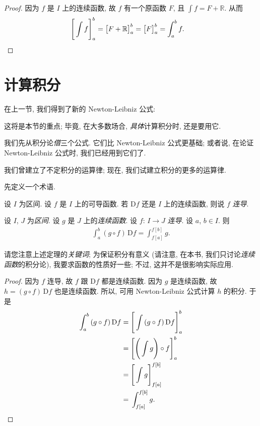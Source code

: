 \begin{proof}
    因为 $f$ 是 $I$ 上的连续函数,
    故 $f$ 有一个原函数 $F$,
    且 $\int {f} = F + \mathbb{R}$.
    从而
    \begin{align*}
         & \Bigg[ \int {f} \Bigg]_{a}^{b}
        = \big[ F + \mathbb{R} \big]_{a}^{b}
        = \big[ F \big]_{a}^{b}
        = \int_{a}^{b} {f}. \qedhere
    \end{align*}
\end{proof}

\section{计算积分}

在上一节, 我们得到了新的 Newton-Leibniz 公式:

\NewNewtonLeibniz*

这将是本节的重点;
毕竟, 在大多数场合, \emph{具体}计算积分时, 还是要用它.

我们先从积分论\emph{借}三个公式.
它们比 Newton-Leibniz 公式更基础;
或者说, 在论证 Newton-Leibniz 公式时, 我们已经用到它们了.

\LinearityOfInegrals*

\AdditivityOfIntervalsOfIntegrals*

我们曾建立了不定积分的运算律;
现在, 我们试建立积分的更多的运算律.

先定义一个术语.

\begin{definition}
    设 $I$ 为区间.
    设 $f$ 是 $I$ 上的可导函数.
    若 $\mathrm{D}f$ 还是 $I$ 上的连续函数,
    则说 $f$ \emph{连导}.
\end{definition}

\begin{theorem}
    设 $I$, $J$ 为\emph{区间}.
    设 $g$ 是 $J$ 上的\emph{连续函数}.
    设 $f$: $I \to J$ \emph{连导}.
    设 $a$, $b \in I$.
    则
    \begin{align*}
        \int_{a}^{b} {(g \circ f)\,\mathrm{D}f} = \int_{f[a]}^{f[b]} {g}.
    \end{align*}
\end{theorem}

请您注意上述定理的\emph{关键词};
为保证积分有意义
(请注意, 在本书, 我们只讨论\emph{连续函数}的积分论),
我要求函数的性质好一些;
不过, 这并不是很影响实际应用.

\begin{proof}
    因为 $f$ 连导, 故 $f$ 跟 $\mathrm{D}f$ 都是连续函数.
    因为 $g$ 是连续函数,
    故 $h = (g \circ f)\,\mathrm{D}f$ 也是连续函数.
    所以, 可用 Newton-Leibniz 公式计算 $h$ 的积分.
    于是
    \begin{align*}
        \int_{a}^{b} {(g \circ f)\,\mathrm{D}f}
        = {} & \Bigg[ \int {(g \circ f)\,\mathrm{D}f} \Bigg]_{a}^{b} \\
        = {} & \Bigg[ \Bigg( \int {g} \Bigg) \circ f \Bigg]_{a}^{b}  \\
        = {} & \Bigg[ \int {g} \Bigg]_{f[a]}^{f[b]}                  \\
        = {} & \int_{f[a]}^{f[b]} {g}. \qedhere
    \end{align*}
\end{proof}

